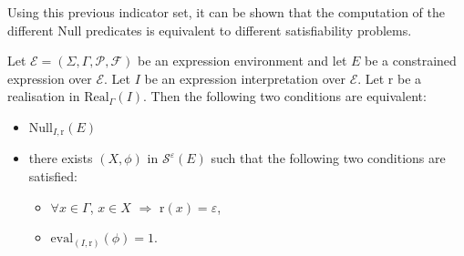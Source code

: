 \documentclass[a4paper]{llncs}
\begin{document}
  Using this previous indicator set, it can be shown that the computation of the different $\mathrm{Null}$ predicates is equivalent to different satisfiability problems. 
  
  \begin{theorem}\label{thm caract null i r}
    Let $\mathcal{E}=(\Sigma,\Gamma,\mathcal{P},\mathcal{F})$ be an expression environment and let $E$ be a constrained expression over $\mathcal{E}$. Let $I$ be  an expression interpretation over $\mathcal{E}$. Let $\mathrm{r}$ be a realisation in $\mathrm{Real}_\Gamma(I)$. Then the  following two conditions are equivalent:
    \begin{itemize}
        \item $\mathrm{Null}_{I,\mathrm{r}}(E)$
        \item there exists $(X,\phi)$ in $\mathcal{S}^{\varepsilon}(E)$ such that the  following two conditions are satisfied:
          \begin{itemize}
            \item $\forall x\in\Gamma$, $x\in X$ $\Rightarrow$ $\mathrm{r}(x)=\varepsilon$,
            \item $\mathrm{eval}_{(I,\mathrm{r})}(\phi)=1$.
          \end{itemize}
     \end{itemize}
  \end{theorem}
\end{document}
